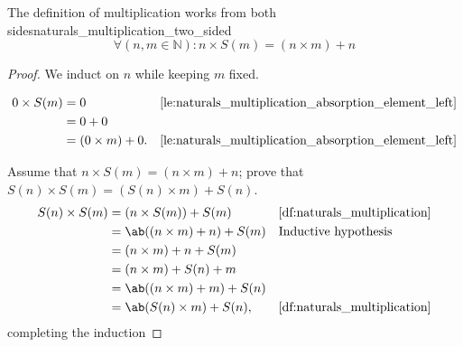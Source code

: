 \begin{lemma}{The definition of multiplication works from both sides}{naturals_multiplication_two_sided}
  \begin{equation*}
    \forall (n, m \in \mathbb{N}) : n \times S(m) = (n \times m) + n
  \end{equation*}
\end{lemma}
\begin{proof}
  We induct on \(n\) while keeping \(m\) fixed.

  \basecase
  \begin{align}
    0 \times S(m) & = 0                 &  & \textrm{\Cref{le:naturals_multiplication_absorption_element_left}} \\
                  & = 0 + 0                                                                                     \\
                  & = (0 \times m) + 0. &  & \textrm{\Cref{le:naturals_multiplication_absorption_element_left}}
  \end{align}

  \inductivestep Assume that \(n \times S(m) = (n \times m) + n\); prove that
  \(S(n) \times S(m) = (S(n) \times m) + S(n)\).
  \begin{align}
    S(n) \times S(m) & = (n \times S(m)) + S(m)       &  & \textrm{\Cref{df:naturals_multiplication}} \\
                     & = \ab((n \times m) + n) + S(m) &  & \textrm{Inductive hypothesis}              \\
                     & = (n \times m) + n + S(m)                                                      \\
                     & = (n \times m) + S(n) + m                                                      \\
                     & = \ab((n \times m) + m) + S(n)                                                 \\
                     & = \ab(S(n) \times m) + S(n),   &  & \textrm{\Cref{df:naturals_multiplication}}
  \end{align}
  completing the induction
\end{proof}

